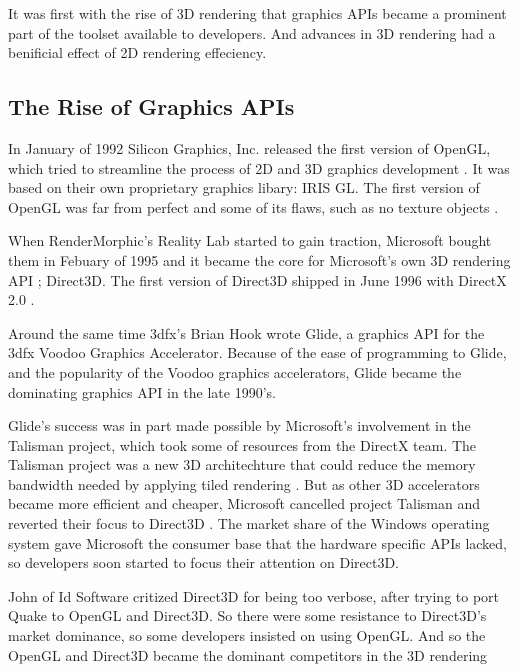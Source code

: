 It was first with the rise of 3D rendering that graphics \glspl{API} became a prominent part of the toolset available to developers.
And advances in 3D rendering had a benificial effect of 2D rendering effeciency.


\subsection{The Rise of Graphics \acs{API}s} 

In January of 1992 Silicon Graphics, Inc. released the first version of OpenGL, which tried to streamline the process of 2D and 3D graphics development \cite{segal1994opengl}.
It was based on their own proprietary graphics libary: \gls{IRIS GL}.
The first version of OpenGL was far from perfect and some of its flaws, such as no texture objects \cite{kronos????history}.

When RenderMorphic's Reality Lab started to gain traction, Microsoft bought them in Febuary of 1995 and it became the core for Microsoft's own 3D rendering \gls{API} \cite{1997crushed}; Direct3D.
The first version of Direct3D shipped in June 1996 with DirectX 2.0 \cite{wikipedia????directx}. 

Around the same time 3dfx's Brian Hook wrote Glide, a graphics API for the 3dfx Voodoo Graphics Accelerator.
Because of the ease of programming to Glide, and the popularity of the Voodoo graphics accelerators, Glide became the dominating graphics \gls{API} in the late 1990's.

Glide's success was in part made possible by Microsoft's involvement in the Talisman project, which took some of resources from the DirectX team.
The Talisman project was a new 3D architechture that could reduce the memory bandwidth needed by applying tiled rendering \cite{torborg1996talisman}.
But as other 3D accelerators became more efficient and cheaper, Microsoft cancelled project Talisman and reverted their focus to Direct3D \cite{wikipedia????talisman}.
The market share of the Windows operating system gave Microsoft the consumer base that the hardware specific \glspl{API} lacked, so developers soon started to focus their attention on Direct3D.

John \citet{carmack1996plan} of Id Software critized Direct3D for being too verbose, after trying to port Quake to OpenGL and Direct3D.
So there were some resistance to Direct3D's market dominance, so some developers insisted on using OpenGL.
And so the OpenGL and Direct3D became the dominant competitors in the 3D rendering 

